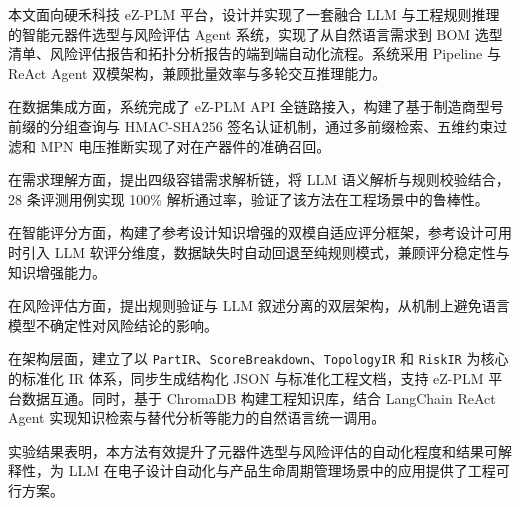 本文面向硬禾科技 eZ-PLM 平台，设计并实现了一套融合 LLM 与工程规则推理的智能元器件选型与风险评估 Agent 系统，实现了从自然语言需求到 BOM 选型清单、风险评估报告和拓扑分析报告的端到端自动化流程。系统采用 Pipeline 与 ReAct Agent 双模架构，兼顾批量效率与多轮交互推理能力。

在数据集成方面，系统完成了 eZ-PLM API 全链路接入，构建了基于制造商型号前缀的分组查询与 HMAC-SHA256 签名认证机制，通过多前缀检索、五维约束过滤和 MPN 电压推断实现了对在产器件的准确召回。

在需求理解方面，提出四级容错需求解析链，将 LLM 语义解析与规则校验结合，28 条评测用例实现 100\% 解析通过率，验证了该方法在工程场景中的鲁棒性。

在智能评分方面，构建了参考设计知识增强的双模自适应评分框架，参考设计可用时引入 LLM 软评分维度，数据缺失时自动回退至纯规则模式，兼顾评分稳定性与知识增强能力。

在风险评估方面，提出规则验证与 LLM 叙述分离的双层架构，从机制上避免语言模型不确定性对风险结论的影响。

在架构层面，建立了以 \texttt{PartIR}、\texttt{ScoreBreakdown}、\texttt{TopologyIR} 和 \texttt{RiskIR} 为核心的标准化 IR 体系，同步生成结构化 JSON 与标准化工程文档，支持 eZ-PLM 平台数据互通。同时，基于 ChromaDB 构建工程知识库，结合 LangChain ReAct Agent 实现知识检索与替代分析等能力的自然语言统一调用。

实验结果表明，本方法有效提升了元器件选型与风险评估的自动化程度和结果可解释性，为 LLM 在电子设计自动化与产品生命周期管理场景中的应用提供了工程可行方案。
